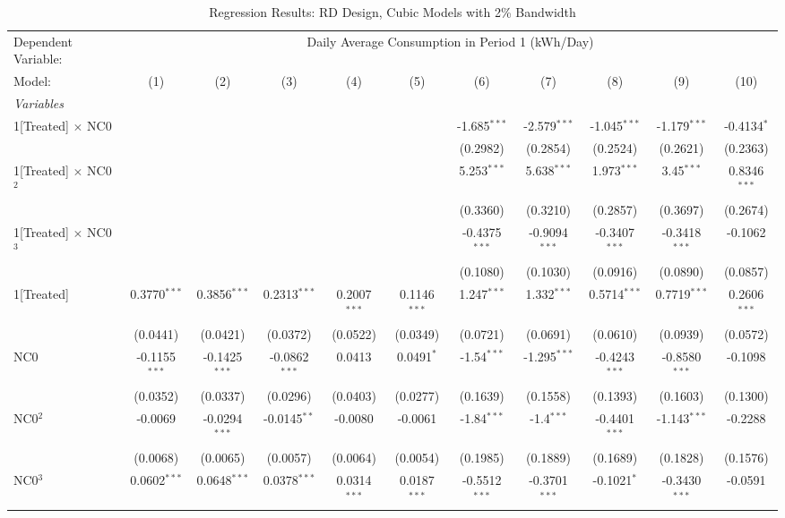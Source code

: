\begin{table}[htbp]
\centering
\caption{\label{Table:Regression-Results_RD_Cubic_BW-2} Regression Results: RD Design, Cubic Models with 2\% Bandwidth}
\begin{tabular}{lcccccccccc}
\tabularnewline\toprule\toprule
Dependent Variable:&\multicolumn{10}{c}{Daily Average Consumption in Period 1 (kWh/Day)}\\
Model:&(1) & (2) & (3) & (4) & (5) & (6) & (7) & (8) & (9) & (10)\\
\midrule
\emph{Variables}&   &   &   &   &   &   &   &   &   &  \\
1[Treated] $\times $ NC0&   &    &    &    &    & -1.685$^{***}$ & -2.579$^{***}$ & -1.045$^{***}$ & -1.179$^{***}$ & -0.4134$^{*}$\\
  &   &    &    &    &    & (0.2982) & (0.2854) & (0.2524) & (0.2621) & (0.2363)\\
1[Treated] $\times $ NC0$^2$&   &    &    &    &    & 5.253$^{***}$ & 5.638$^{***}$ & 1.973$^{***}$ & 3.45$^{***}$ & 0.8346$^{***}$\\
  &   &    &    &    &    & (0.3360) & (0.3210) & (0.2857) & (0.3697) & (0.2674)\\
1[Treated] $\times $ NC0$^3$&   &    &    &    &    & -0.4375$^{***}$ & -0.9094$^{***}$ & -0.3407$^{***}$ & -0.3418$^{***}$ & -0.1062\\
  &   &    &    &    &    & (0.1080) & (0.1030) & (0.0916) & (0.0890) & (0.0857)\\
1[Treated]&0.3770$^{***}$ & 0.3856$^{***}$ & 0.2313$^{***}$ & 0.2007$^{***}$ & 0.1146$^{***}$ & 1.247$^{***}$ & 1.332$^{***}$ & 0.5714$^{***}$ & 0.7719$^{***}$ & 0.2606$^{***}$\\
  &(0.0441) & (0.0421) & (0.0372) & (0.0522) & (0.0349) & (0.0721) & (0.0691) & (0.0610) & (0.0939) & (0.0572)\\
NC0&-0.1155$^{***}$ & -0.1425$^{***}$ & -0.0862$^{***}$ & 0.0413 & 0.0491$^{*}$ & -1.54$^{***}$ & -1.295$^{***}$ & -0.4243$^{***}$ & -0.8580$^{***}$ & -0.1098\\
  &(0.0352) & (0.0337) & (0.0296) & (0.0403) & (0.0277) & (0.1639) & (0.1558) & (0.1393) & (0.1603) & (0.1300)\\
NC0$^2$&-0.0069 & -0.0294$^{***}$ & -0.0145$^{**}$ & -0.0080 & -0.0061 & -1.84$^{***}$ & -1.4$^{***}$ & -0.4401$^{***}$ & -1.143$^{***}$ & -0.2288\\
  &(0.0068) & (0.0065) & (0.0057) & (0.0064) & (0.0054) & (0.1985) & (0.1889) & (0.1689) & (0.1828) & (0.1576)\\
NC0$^3$&0.0602$^{***}$ & 0.0648$^{***}$ & 0.0378$^{***}$ & 0.0314$^{***}$ & 0.0187$^{***}$ & -0.5512$^{***}$ & -0.3701$^{***}$ & -0.1021$^{*}$ & -0.3430$^{***}$ & -0.0591\\

\end{tabular}
\end{table}
